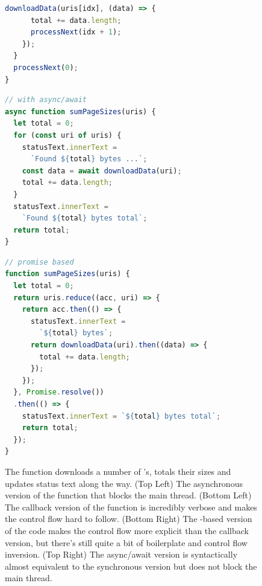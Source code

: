 \begin{figure}
\begin{minipage}[t]{0.5\textwidth}
\begin{minipage}{\textwidth}
\begin{lstlisting}[language=JavaScript]
    downloadData(uris[idx], (data) => {
      total += data.length;
      processNext(idx + 1);
    });
  }
  processNext(0);
}
\end{lstlisting}
    \end{minipage}
  \end{minipage}\hfill%
  \begin{minipage}[t]{0.5\textwidth}
    \begin{minipage}{\textwidth}%
\begin{lstlisting}[language=JavaScript]
// with async/await
async function sumPageSizes(uris) {
  let total = 0;
  for (const uri of uris) {
    statusText.innerText = 
      `Found ${total} bytes ...`;
    const data = await downloadData(uri);
    total += data.length;
  }
  statusText.innerText = 
    `Found ${total} bytes total`;
  return total;
}
\end{lstlisting}
      \vspace{1em}
    \end{minipage}
    \begin{minipage}{\textwidth}%
\begin{lstlisting}[language=JavaScript]
// promise based
function sumPageSizes(uris) {
  let total = 0;
  return uris.reduce((acc, uri) => {
    return acc.then(() => {
      statusText.innerText = 
        `${total} bytes`;
      return downloadData(uri).then((data) => {
        total += data.length;
      });
    });
  }, Promise.resolve())
  .then(() => {
    statusText.innerText = `${total} bytes total`;
    return total;
  });
}
\end{lstlisting}
    \end{minipage}
  \end{minipage}
  \cprotect\caption{The  function downloads a number of 's, totals their sizes and updates status text along the way. (Top Left) The asynchronous version of the function that blocks the main thread. (Bottom Left) The callback version of the function is incredibly verbose and makes the control flow hard to follow. (Bottom Right) The -based version of the code makes the control flow more explicit than the callback version, but there's still quite a bit of boilerplate and control flow inversion. (Top Right) The async/await version is syntactically almost equivalent to the synchronous version but does not block the main thread.}\label{fig:motivation:evolution}
\end{figure}
